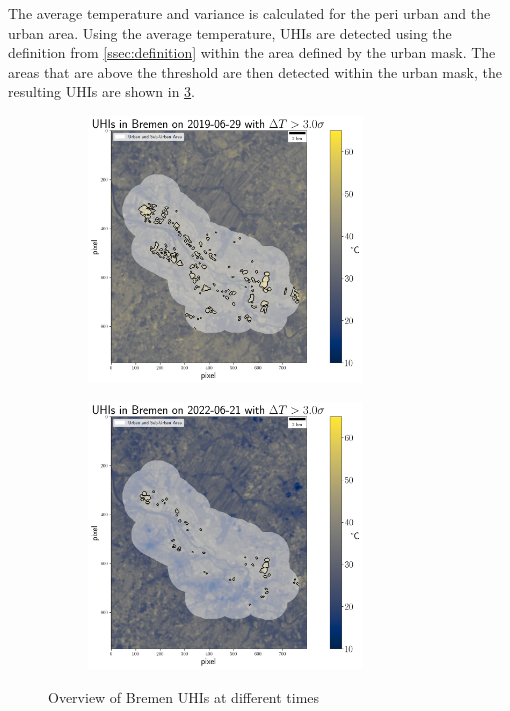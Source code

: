 \documentclass[12pt,a4paper, english,twoside]{scrartcl}
\begin{document}
        The average temperature and variance is calculated for the peri urban and the urban area.
        Using the average temperature, \glspl{UHI} are detected using the definition from \cref{ssec:definition} within the area defined by the urban mask. 
        The areas that are above the threshold are then detected within the urban mask, the resulting \glspl{UHI} are shown in \cref{fig:AnalysisBre}. 
   \begin{figure}[!p]
       \begin{subfigure}{\textwidth}
          \centering
          \includegraphics[width=0.8\textwidth]{img/UHIs_Bremen_2019-06-29_s:3}
         \label{fig:uhis2019}
       \end{subfigure}

       \begin{subfigure}{\textwidth}
          \centering
          \includegraphics[width=0.8\textwidth]{img/UHIs_Bremen_2022-06-21_s:3}
         \label{fig:uhis2022}
       \end{subfigure}
         \caption{Overview of Bremen \glspl{UHI} at different times}\label{fig:AnalysisBre}
   \end{figure}
\end{document}
